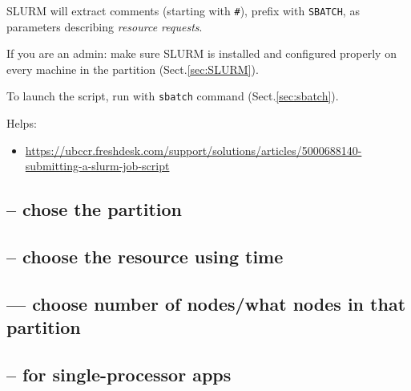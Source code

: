 SLURM will extract comments (starting with
\verb!#!), prefix with \verb!SBATCH!, as parameters describing {\it resource
requests}. 

\begin{mdframed}
If you are an admin: make sure SLURM is installed and configured properly on
every machine in the partition (Sect.\ref{sec:SLURM}). 
\end{mdframed}

To launch the script, run with \verb!sbatch! command (Sect.\ref{sec:sbatch}).

Helps:
\begin{itemize}
  \item    \url{https://ubccr.freshdesk.com/support/solutions/articles/5000688140-submitting-a-slurm-job-script}
  
\end{itemize}



%   
%   
\subsection{-- chose the partition}

\subsection{-- choose the resource using time}

\subsection{--- choose number of nodes/what nodes in that partition}

\subsection{-- for single-processor apps}

